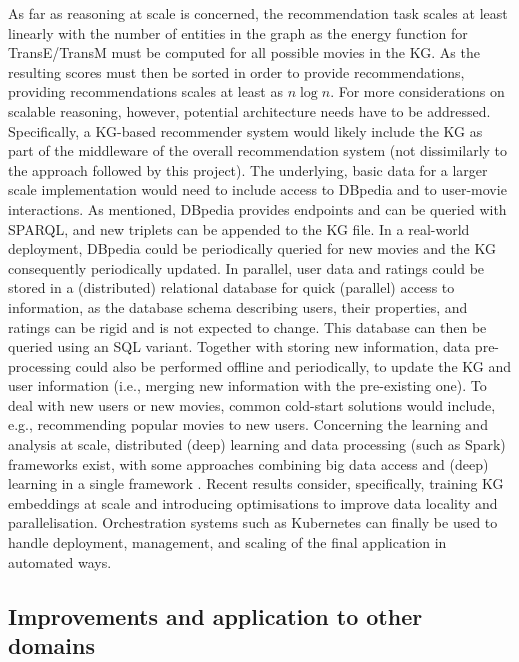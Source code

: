 As far as reasoning at scale is concerned, the recommendation task scales at least linearly with the number of entities in the graph as the energy function for TransE/TransM must be computed for all possible movies in the KG.
As the resulting scores must then be sorted in order to provide recommendations, providing recommendations scales at least as $n\log{n}$.
For more considerations on scalable reasoning, however, potential architecture needs have to be addressed.
Specifically, a KG-based recommender system would likely include the KG as part of the middleware of the overall recommendation system (not dissimilarly to the approach followed by this project).
The underlying, basic data for a larger scale implementation would need to include access to DBpedia and to user-movie interactions.
As mentioned, DBpedia provides endpoints and can be queried with SPARQL, and new triplets can be appended to the KG file.
In a real-world deployment, DBpedia could be periodically queried for new movies and the KG consequently periodically updated.
In parallel, user data and ratings could be stored in a (distributed) relational database for quick (parallel) access to information, as the database schema describing users, their properties, and ratings can be rigid and is not expected to change.
This database can then be queried using an SQL variant.
Together with storing new information, data pre-processing could also be performed offline and periodically, to update the KG and user information (i.e., merging new information with the pre-existing one).
To deal with new users or new movies, common cold-start solutions would include, e.g., recommending popular movies to new users.
Concerning the learning and analysis at scale, distributed (deep) learning and data processing (such as Spark) frameworks exist, with some approaches combining big data access and (deep) learning in a single framework \parencite{kim2016deepspark}.
Recent results \parencite{zheng2020dgl} consider, specifically, training KG embeddings at scale and introducing optimisations to improve data locality and parallelisation.
Orchestration systems such as Kubernetes can finally be used to handle deployment, management, and scaling of the final application in automated ways.


\subsection{Improvements and application to other domains}

